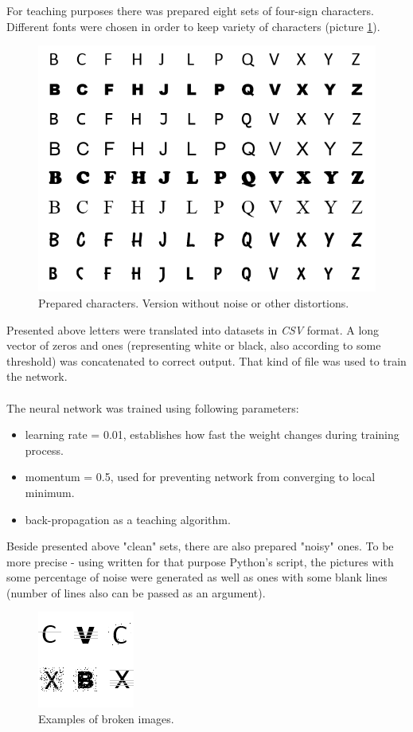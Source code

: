 \documentclass[eng,openany]{mgr}
\begin{document}
For teaching purposes there was prepared eight sets of four-sign characters. Different fonts were chosen in order to keep variety of characters (picture \ref{fig:alphabet}).
\begin{figure}[h]
\centering
\includegraphics[width=0.7\linewidth]{./alphabet}
\caption{Prepared characters. Version without noise or other distortions.}
\label{fig:alphabet}
\end{figure}
Presented above letters were translated into datasets in \textit{CSV} format. A long vector of zeros and ones (representing white or black, also according to some threshold) was concatenated to correct output. That kind of file was used to train the network.
\\
\\
The neural network was trained using following parameters:
\begin{itemize}
\item learning rate = 0.01, establishes how fast the weight changes during training process.
\item momentum = 0.5, used for preventing network from converging to local minimum.
\item back-propagation as a teaching algorithm.
\end{itemize}
Beside presented above "clean" sets, there are also prepared "noisy" ones. To be more precise - using written for that purpose Python's  script, the pictures with some percentage of noise were generated as well as ones with some blank lines (number of lines also can be passed as an argument).
\begin{figure}[h]
\centering
\includegraphics[width=0.3\linewidth]{./c}
\caption{Examples of broken images.}
\label{fig:c}
\end{figure}
\newpage
\end{document}
